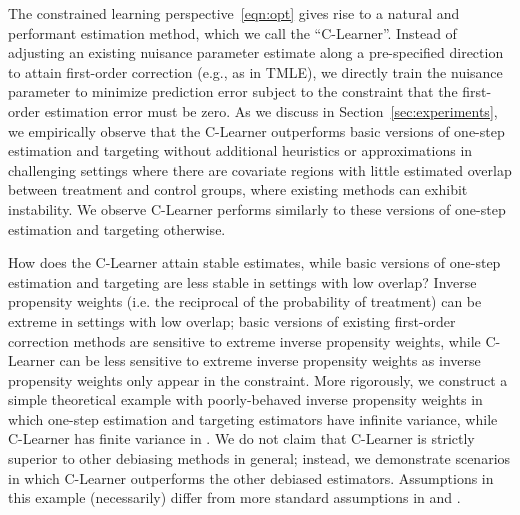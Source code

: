 The constrained learning perspective~\eqref{eqn:opt} gives rise to a  natural and performant estimation method, which we call the ``C-Learner''. Instead of adjusting an existing nuisance parameter estimate along a pre-specified direction to attain first-order correction (e.g., as in TMLE), 
we directly train the nuisance parameter to minimize prediction error subject to the constraint that the first-order estimation error must be zero.  As 
we discuss in Section~\ref{sec:experiments}, we empirically observe that the C-Learner 
outperforms basic versions of one-step estimation and targeting without additional heuristics or approximations in challenging settings where there are covariate regions with little estimated overlap between treatment and control groups, where existing methods can exhibit instability. 
We observe C-Learner performs similarly to these versions of one-step estimation and targeting otherwise.

How does the C-Learner attain stable estimates, while basic versions of one-step estimation and targeting are less stable in settings with low overlap? %
Inverse propensity weights (i.e. the reciprocal of the probability of treatment) can be extreme in settings with low overlap; basic versions of existing first-order correction methods are sensitive to extreme inverse propensity weights, while C-Learner can be less sensitive to extreme inverse propensity weights as inverse propensity weights only appear in the constraint. More rigorously, 
we construct a simple theoretical example with poorly-behaved inverse propensity weights in which one-step estimation and targeting estimators have infinite variance, while C-Learner has finite variance in . We do not claim that C-Learner is strictly superior to other debiasing methods in general; instead, we demonstrate scenarios in which C-Learner outperforms the other debiased estimators. Assumptions in this example (necessarily) differ from more standard assumptions in  and . 


